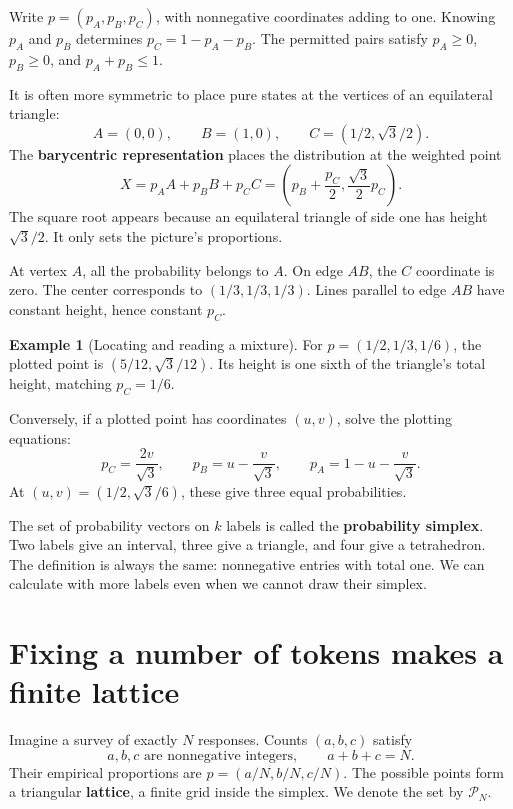 \documentclass[11pt,oneside,openany]{book}
\theoremstyle{definition}
\newtheorem{example}{Example}[chapter]
\theoremstyle{remark}
\numberwithin{equation}{chapter}
\begin{document}
Write \(p=(p_A,p_B,p_C)\), with nonnegative coordinates adding to one. Knowing \(p_A\) and \(p_B\) determines \(p_C=1-p_A-p_B\). The permitted pairs satisfy \(p_A\geq0\), \(p_B\geq0\), and \(p_A+p_B\leq1\).

It is often more symmetric to place pure states at the vertices of an equilateral triangle: \[A=(0,0),\qquad B=(1,0),\qquad C=(1/2,\sqrt3/2).\] The \textbf{barycentric representation} places the distribution at the weighted point \[X=p_AA+p_BB+p_CC
=\left(p_B+\frac{p_C}{2},\frac{\sqrt3}{2}p_C\right).\] The square root appears because an equilateral triangle of side one has height \(\sqrt3/2\). It only sets the picture's proportions.

At vertex \(A\), all the probability belongs to \(A\). On edge \(AB\), the \(C\) coordinate is zero. The center corresponds to \((1/3,1/3,1/3)\). Lines parallel to edge \(AB\) have constant height, hence constant \(p_C\).

\begin{example}[Locating and reading a mixture]

For \(p=(1/2,1/3,1/6)\), the plotted point is \((5/12,\sqrt3/12)\). Its height is one sixth of the triangle's total height, matching \(p_C=1/6\).

Conversely, if a plotted point has coordinates \((u,v)\), solve the plotting equations: \[p_C=\frac{2v}{\sqrt3},\qquad
p_B=u-\frac{v}{\sqrt3},\qquad
p_A=1-u-\frac{v}{\sqrt3}.\] At \((u,v)=(1/2,\sqrt3/6)\), these give three equal probabilities.

\end{example}

The set of probability vectors on \(k\) labels is called the \textbf{probability simplex}. Two labels give an interval, three give a triangle, and four give a tetrahedron. The definition is always the same: nonnegative entries with total one. We can calculate with more labels even when we cannot draw their simplex.

\section{Fixing a number of tokens makes a finite lattice}\label{ch03-fixing-a-number-of-tokens-makes-a-finite-lattice}

Imagine a survey of exactly \(N\) responses. Counts \((a,b,c)\) satisfy \[a,b,c\text{ are nonnegative integers},\qquad a+b+c=N.\] Their empirical proportions are \(p=(a/N,b/N,c/N)\). The possible points form a triangular \textbf{lattice}, a finite grid inside the simplex. We denote the set by \(\mathcal P_N\).
\end{document}
